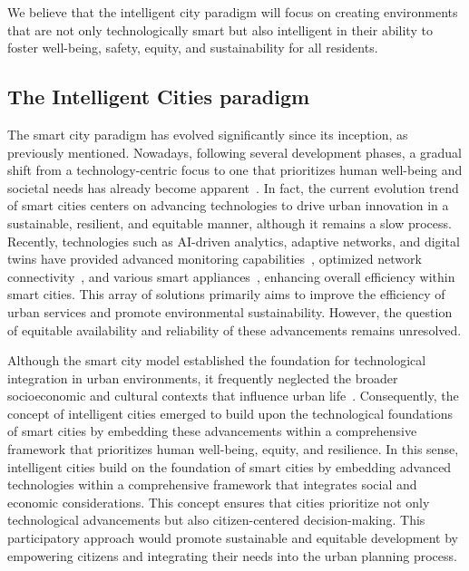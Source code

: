 \documentclass[smartcities,article,submit,pdftex,moreauthors]{Definitions/mdpi}
\begin{document}
We believe that the intelligent city paradigm will focus on creating environments that are not only technologically smart but also intelligent in their ability to foster well-being, safety, equity, and sustainability for all residents.


\subsection{The Intelligent Cities paradigm}
The smart city paradigm has evolved significantly since its inception, as previously mentioned. Nowadays, following several development phases, a gradual shift from a technology-centric focus to one that prioritizes human well-being and societal needs has already become apparent~\cite{singhDecadeReviewSmart2022,SCInclusiveFuture}. In fact, the current evolution trend of smart cities centers on advancing technologies to drive urban innovation in a sustainable, resilient, and equitable manner, although it remains a slow process. Recently, technologies such as AI-driven analytics, adaptive networks, and digital twins have provided advanced monitoring capabilities~\cite{zengSensorsInternetThings2024}, optimized network connectivity~\cite{resilienceSC1}, and various smart appliances~\cite{kumarEnergyEfficientSmartComfort2014,saeedIoTBasedIntelligentModeling2018,Singh2023}, enhancing overall efficiency within smart cities. This array of solutions primarily aims to improve the efficiency of urban services and promote environmental sustainability. However, the question of equitable availability and reliability of these advancements remains unresolved. 

Although the smart city model established the foundation for technological integration in urban environments, it frequently neglected the broader socioeconomic and cultural contexts that influence urban life~\cite{SCHappiness}. Consequently, the concept of intelligent cities emerged to build upon the technological foundations of smart cities by embedding these advancements within a comprehensive framework that prioritizes human well-being, equity, and resilience. In this sense, intelligent cities build on the foundation of smart cities by embedding advanced technologies within a comprehensive framework that integrates social and economic considerations. This concept ensures that cities prioritize not only technological advancements but also citizen-centered decision-making. This participatory approach would promote sustainable and equitable development by empowering citizens and integrating their needs into the urban planning process.
\end{document}

